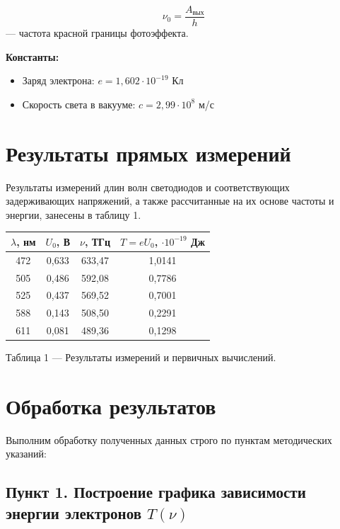 \documentclass[a4paper,12pt]{article}
\begin{document}
\begin{equation}
\nu_0 = \frac{A_{\text{вых}}}{h} \tag{5}
\end{equation}
— частота красной границы фотоэффекта.

\vspace{0.5cm}
\textbf{Константы:}
\begin{itemize}
    \item Заряд электрона: $e = 1{,}602 \cdot 10^{-19}$ Кл
    \item Скорость света в вакууме: $c = 2{,}99 \cdot 10^8$ м/с
\end{itemize}

\newpage

\section{Результаты прямых измерений}

Результаты измерений длин волн светодиодов и соответствующих задерживающих напряжений, а также рассчитанные на их основе частоты и энергии, занесены в таблицу 1.

\begin{center}
\begin{tabular}{|c|c|c|c|}
\hline
$\lambda$, нм & $U_0$, В & $\nu$, ТГц & $T = eU_0$, $\cdot 10^{-19}$ Дж \\ \hline
472 & 0,633 & 633,47 & 1,0141 \\ \hline
505 & 0,486 & 592,08 & 0,7786 \\ \hline
525 & 0,437 & 569,52 & 0,7001 \\ \hline
588 & 0,143 & 508,50 & 0,2291 \\ \hline
611 & 0,081 & 489,36 & 0,1298 \\ \hline
\end{tabular}

\medskip
Таблица 1 — Результаты измерений и первичных вычислений.
\end{center}

\section{Обработка результатов}

Выполним обработку полученных данных строго по пунктам методических указаний:

\subsection*{Пункт 1. Построение графика зависимости энергии электронов $T(\nu)$}
\end{document}
